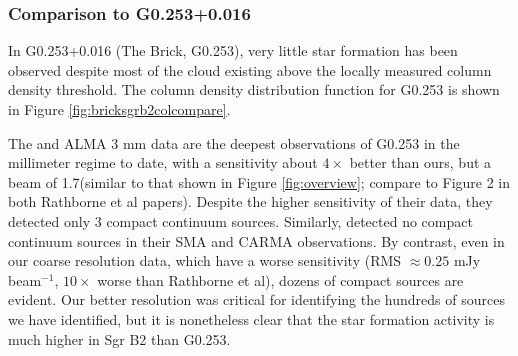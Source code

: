 \documentclass[twocolumn]{aastex61}
\begin{document}


\subsubsection{Comparison to G0.253+0.016}
In G0.253+0.016 (The Brick, G0.253), very little star formation
has been observed
\citep{Longmore2013a,Johnston2014a,Rathborne2014a,Rathborne2015a} despite most
of the cloud existing above the locally measured \citet{Lada2010a} column
density threshold.  The column density distribution function for G0.253
is shown in Figure \ref{fig:bricksgrb2colcompare}.

The \citet{Rathborne2014a} and \citet{Rathborne2015a} ALMA 3 mm data are the
deepest observations of G0.253 in the millimeter regime to date, with a
sensitivity about $4\times$ better than ours, but a beam of 1.7\arcsec (similar
to that shown in Figure \ref{fig:overview}; compare to Figure 2 in both
Rathborne et al papers).  Despite the higher sensitivity of their data,
they detected only 3 compact continuum sources.  Similarly,
\citet{Kauffmann2013a} detected no compact continuum sources in their SMA and
CARMA observations.  By contrast, even in our coarse resolution data, which
have a worse sensitivity (RMS $\approx 0.25$ mJy beam$^{-1}$, $10\times$ worse
than Rathborne et al), dozens of compact sources are evident.  Our better
resolution was critical for identifying the hundreds of sources we have
identified, but it is nonetheless clear that the star formation activity is
much higher in Sgr B2 than G0.253.
\end{document}
